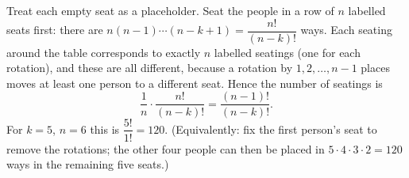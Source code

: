 Treat each empty seat as a placeholder. Seat the people in a row of $n$ labelled seats first: there are $n(n-1)\cdots(n-k+1)=\dfrac{n!}{(n-k)!}$ ways. Each seating around the table corresponds to exactly $n$ labelled seatings (one for each rotation), and these are all different, because a rotation by $1,2,\dots,n-1$ places moves at least one person to a different seat. Hence the number of seatings is
\[
\dfrac{1}{n}\cdot\dfrac{n!}{(n-k)!}=\boxed{\dfrac{(n-1)!}{(n-k)!}} .
\]
For $k=5$, $n=6$ this is $\dfrac{5!}{1!}=\boxed{120}$. (Equivalently: fix the first person's seat to remove the rotations; the other four people can then be placed in $5\cdot4\cdot3\cdot2=120$ ways in the remaining five seats.)

